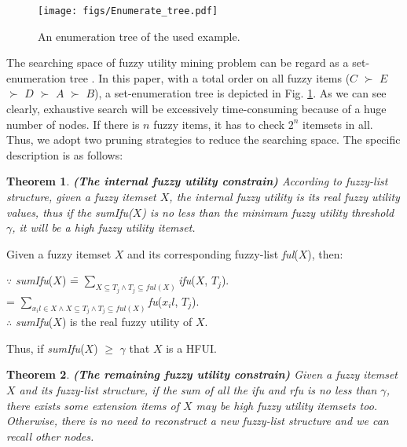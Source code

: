 \documentclass[journal]{IEEEtran}
\newenvironment{proof}{{\noindent\it\bf Proof}\quad}{\par}
\newtheorem{theorem}{Theorem}   %
\begin{document}
\begin{figure}[hbtp]
	\centering
	\texttt{[image: figs/Enumerate\_tree.pdf]}
	\caption{An enumeration tree of the used example.}
	\label{fig:enumeratetree}
\end{figure}

The searching space of fuzzy utility mining problem can be regard as a set-enumeration tree \cite{liu2005two}. In this paper, with a total order on all fuzzy items ($C$ $\succ$ $E$ $\succ$ $D$ $\succ$ $A$ $\succ$ $B$), a set-enumeration tree is depicted in Fig. \ref{fig:enumeratetree}. As we can see clearly, exhaustive search will be excessively time-consuming because of a huge number of nodes. If there is $n$ fuzzy items, it has to check $2^n$ itemsets in all. Thus, we adopt two pruning strategies to reduce the searching space. The specific description is as follows:

\begin{theorem}
	\textbf{(The internal fuzzy utility constrain)}
	\label{theo:sumIfu}
	\rm According to fuzzy-list structure, given a fuzzy itemset $X$, the internal fuzzy utility is its real fuzzy utility values, thus if the \textit{sumIfu}($X$) is no less than the minimum fuzzy utility threshold $\gamma$, it will be a high fuzzy utility itemset.
\end{theorem}

\begin{proof}
	Given a fuzzy itemset $X$ and its corresponding fuzzy-list \textit{ful}($X$), then:
	\begin{tabbing}
		$\because$ \textit{sumIfu}($X$) \=
		= $\sum_{X \subseteq T_j \land T_j \subseteq ful(X)}$\textit{ifu}($X$, $T_j$). \\
		\> = $\sum_{x_il \in X \land X \subseteq T_j \land T_j \subseteq ful(X)}$\textit{fu}($x_il$, $T_j$). \\
		$\therefore$ \textit{sumIfu}($X$) is the real fuzzy utility of $X$.
	\end{tabbing}
	Thus, if \textit{sumIfu}($X$) $\ge$ $\gamma$ that $X$ is a HFUI.
\end{proof}

\begin{theorem}
	\textbf{(The remaining fuzzy utility constrain)}
	\label{theo:sumRfu}
	\rm Given a fuzzy itemset $X$ and its fuzzy-list structure, if the sum of all the \textit{ifu} and \textit{rfu} is no less than $\gamma$, there exists some extension items of $X$ may be high fuzzy utility itemsets too. Otherwise, there is no need to reconstruct a new fuzzy-list structure and we can recall other nodes.
\end{theorem}
\end{document}
